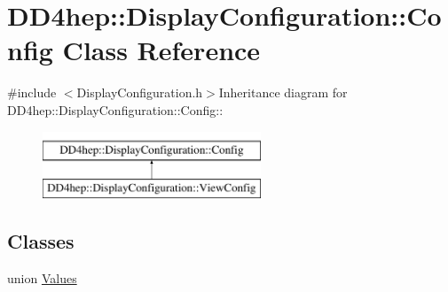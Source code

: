 \hypertarget{class_d_d4hep_1_1_display_configuration_1_1_config}{
\section{DD4hep::DisplayConfiguration::Config Class Reference}
\label{class_d_d4hep_1_1_display_configuration_1_1_config}
}


{\ttfamily \#include $<$DisplayConfiguration.h$>$}Inheritance diagram for DD4hep::DisplayConfiguration::Config::\begin{figure}[H]
\begin{center}
\leavevmode
\includegraphics[height=2cm]{class_d_d4hep_1_1_display_configuration_1_1_config}
\end{center}
\end{figure}
\subsection*{Classes}
\begin{DoxyCompactItemize}
\item 
union \hyperlink{union_d_d4hep_1_1_display_configuration_1_1_config_1_1_values}{Values}
\end{DoxyCompactItemize}
